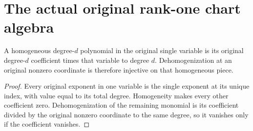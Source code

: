 \section{The actual original rank-one chart algebra}

\begin{lemma}
\label{lem:fc-native-rank-one-homogeneous-polynomial}
\leanok
{}
A homogeneous degree-$d$ polynomial in the original single variable is
its original degree-$d$ coefficient times that variable to degree $d$.
Dehomogenization at an original nonzero coordinate is therefore injective
on that homogeneous piece.
\end{lemma}
\begin{proof}
Every original exponent in one variable is the single exponent at its
unique index, with value equal to its total degree. Homogeneity makes
every other coefficient zero. Dehomogenization of the remaining monomial
is its coefficient divided by the original nonzero coordinate to the
same degree, so it vanishes only if the coefficient vanishes.
\end{proof}

